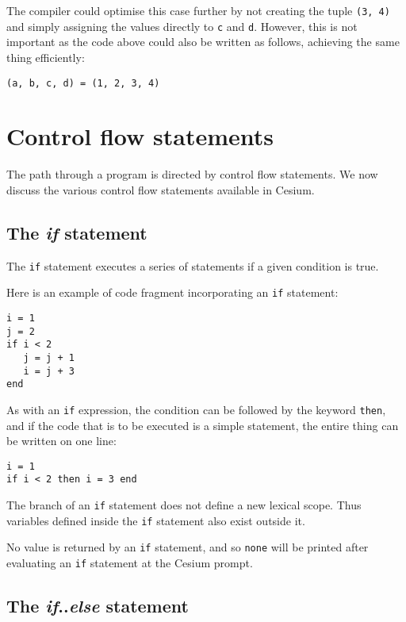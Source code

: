 \documentclass[a4paper,10pt]{article}
\newcommand{\code}{\lstinline}
\begin{document}
{The compiler could optimise this case further by not creating the tuple \code{(3, 4)} and simply
assigning the values directly to \code{c} and \code{d}. However, this is not important as the
code above could also be written as follows, achieving the same thing efficiently:

\begin{lstlisting}
(a, b, c, d) = (1, 2, 3, 4)
\end{lstlisting}

\section{Control flow statements}

The path through a program is directed by control flow statements. We now discuss the various 
control flow statements available in Cesium.

\subsection{The \textit{if} statement}

The \code{if} statement executes a series of statements if a given condition is true.

Here is an example of code fragment incorporating an \code{if} statement:

\begin{lstlisting}
i = 1
j = 2
if i < 2
   j = j + 1
   i = j + 3
end
\end{lstlisting}

As with an \code{if} expression, the condition can be followed by the keyword \code{then}, and if 
the code that is to be executed is a simple statement, the entire thing can be written on one line:

\begin{lstlisting}
i = 1
if i < 2 then i = 3 end
\end{lstlisting}

The branch of an \code{if} statement does not define a new lexical scope. Thus variables defined 
inside the \code{if} statement also exist outside it.

No value is returned by an \code{if} statement, and so \code{none} will be printed after
evaluating an \code{if} statement at the Cesium prompt.

\subsection{The \textit{if}..\textit{else} statement}

}
\end{document}
